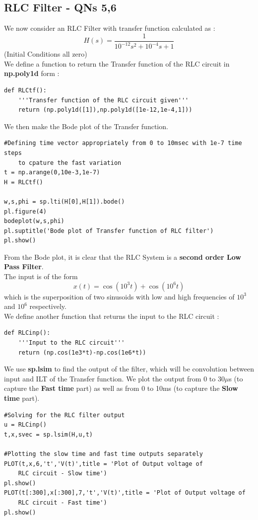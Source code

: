 \documentclass[11pt, a4paper]{article}
\begin{document}
\subsection{RLC Filter - QNs 5,6}
{
We now consider an RLC Filter with transfer function calculated as :
\[ H(s) = \frac{1}{10^{-12}s^2 + 10^{-4}s + 1}\]
(Initial Conditions all zero)
\\We define a function to return the Transfer function of the RLC circuit in \textbf{np.poly1d} form :
\begin{verbatim}
def RLCtf():
	'''Transfer function of the RLC circuit given'''
	return (np.poly1d([1]),np.poly1d([1e-12,1e-4,1]))
\end{verbatim}
We then make the Bode plot of the Transfer function.
\begin{verbatim}
#Defining time vector appropriately from 0 to 10msec with 1e-7 time steps 
	to cpature the fast variation
t = np.arange(0,10e-3,1e-7)
H = RLCtf()

w,s,phi = sp.lti(H[0],H[1]).bode()
pl.figure(4)
bodeplot(w,s,phi) 
pl.suptitle('Bode plot of Transfer function of RLC filter')
pl.show()

\end{verbatim}
{
From the Bode plot, it is clear that the RLC System is a \textbf{second order Low Pass Filter}.
}
\\
The input is of the form
\[x(t) = \cos{(10^3t)}+\cos{(10^6t)} \]
which is the superposition of two sinusoids with low and high frequencies of $10^3$ and $10^6$ respectively.
\\We define another function that returns the input to the RLC circuit :
\begin{verbatim}
def RLCinp():
	'''Input to the RLC circuit'''
	return (np.cos(1e3*t)-np.cos(1e6*t))
\end{verbatim}
We use \textbf{sp.lsim} to find the output of the filter, which will be convolution between input and ILT of the Transfer function.
We plot the output from 0 to 30$\mu$s (to capture the \textbf{Fast time} part) as well as from 0 to 10ms (to capture the \textbf{Slow time} part).
}
\begin{verbatim}
#Solving for the RLC filter output
u = RLCinp()
t,x,svec = sp.lsim(H,u,t)

#Plotting the slow time and fast time outputs separately
PLOT(t,x,6,'t','V(t)',title = 'Plot of Output voltage of
	RLC circuit - Slow time')
pl.show()
PLOT(t[:300],x[:300],7,'t','V(t)',title = 'Plot of Output voltage of 
	RLC circuit - Fast time')
pl.show()

\end{verbatim}
\end{document}
